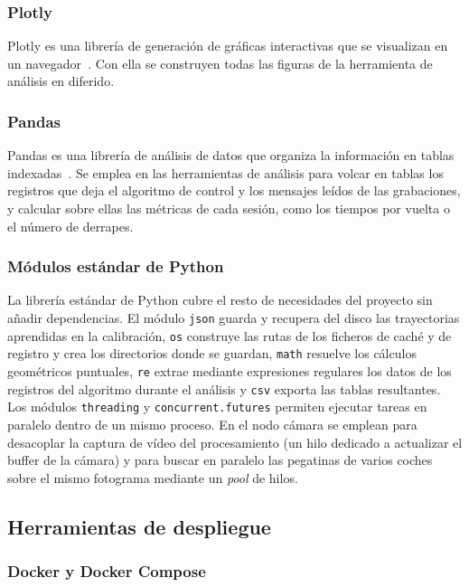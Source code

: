 \subsubsection{Plotly}
Plotly es una librería de generación de gráficas interactivas que se visualizan en un navegador~\cite{plotly}. Con ella se construyen todas las figuras de la herramienta de análisis en diferido. %

\subsubsection{Pandas}
Pandas es una librería de análisis de datos que organiza la información en tablas indexadas~\cite{pandas}. Se emplea en las herramientas de análisis para volcar en tablas los registros que deja el algoritmo de control y los mensajes leídos de las grabaciones, y calcular sobre ellas las métricas de cada sesión, como los tiempos por vuelta o el número de derrapes.
\subsubsection{Módulos estándar de Python}
La librería estándar de Python cubre el resto de necesidades del proyecto sin añadir dependencias. El módulo \texttt{json} guarda y recupera del disco las trayectorias aprendidas en la calibración, \texttt{os} construye las rutas de los ficheros de caché y de registro y crea los directorios donde se guardan, \texttt{math} resuelve los cálculos geométricos puntuales, %
\texttt{re} extrae mediante expresiones regulares los datos de los registros del algoritmo durante el análisis y \texttt{csv} exporta las tablas resultantes. Los módulos \texttt{threading} y \texttt{concurrent.futures} permiten ejecutar tareas en paralelo dentro de un mismo proceso. En el nodo cámara se emplean para desacoplar la captura de vídeo del procesamiento (un hilo dedicado a actualizar el buffer de la cámara) y para buscar en paralelo las pegatinas de varios coches sobre el mismo fotograma mediante un \textit{pool} de hilos.

\subsection{Herramientas de despliegue}

\subsubsection{Docker y Docker Compose}

